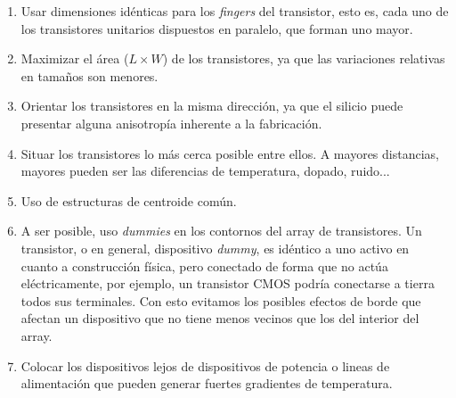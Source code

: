 \begin{enumerate}
	\item Usar dimensiones idénticas para los \textit{fingers} del transistor,
	esto es, cada uno de los transistores unitarios dispuestos en paralelo,
	que forman uno mayor.
	\item Maximizar el área ($L \times W$) de los transistores, ya que las
	variaciones relativas en tamaños son menores.
	\item Orientar los transistores en la misma dirección, ya que el silicio
	puede presentar alguna anisotropía inherente a la fabricación.
	\item Situar los transistores lo más cerca posible entre ellos. A mayores
	distancias, mayores pueden ser las diferencias de temperatura, dopado, ruido...
	\item Uso de estructuras de centroide común.
	\item A ser posible, uso \textit{dummies} en los contornos del
	array de transistores. Un transistor, o en general, dispositivo \textit{dummy},
	es idéntico a uno activo en cuanto a construcción física, pero conectado de
	forma que no actúa eléctricamente, por ejemplo, un transistor CMOS podría
	conectarse a tierra todos sus terminales.
	Con esto evitamos los posibles efectos de borde que afectan un dispositivo
	que no tiene menos vecinos que los del interior del array.
	\item Colocar los dispositivos lejos de dispositivos de potencia o lineas
	de alimentación que pueden generar fuertes gradientes de temperatura.
\end{enumerate}

